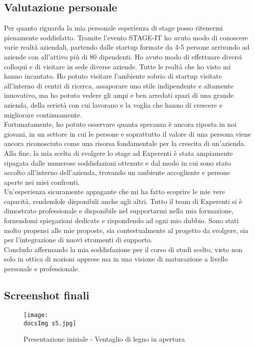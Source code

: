 \subsection{Valutazione personale}
Per quanto riguarda la mia personale esperienza di stage posso ritenermi pienamente soddisfatto. Tramite l'evento STAGE-IT ho avuto modo di conoscere varie realt\`a aziendali, partendo dalle startup formate da 4-5 persone arrivando ad aziende con all'attivo pi\`u di 80 dipendenti. Ho avuto modo di effettuare diversi colloqui e di visitare in sede diverse aziende. Tutte le realt\`a che ho visto mi hanno incantato. Ho potuto visitare l'ambiente sobrio di startup visitate all'interno di centri di ricerca, assaporare uno stile indipendente e altamente innovativo, ma ho potuto vedere gli ampi e ben arredati spazi di una grande azienda, della seriet\`a con cui lavorano e la voglia che hanno di crescere e migliorare continuamente.\\
Fortunatamente, ho potuto osservare quanta speranza \`e ancora riposta in noi giovani, in un settore in cui le persone e soprattutto il valore di una persona viene ancora riconosciuto come una risorsa fondamentale per la crescita di un'azienda.\\
Alla fine, la mia scelta di svolgere lo stage ad Experenti \`e stata ampiamente ripagata dalle numerose soddisfazioni ottenute e dal modo in cui sono stato accolto all'interno dell'azienda, trovando un ambiente accogliente e persone aperte nei miei confronti.\\
Un'esperienza sicuramente appagante che mi ha fatto scoprire le mie vere capacit\`a, rendendole disponibili anche agli altri.
Tutto il team di Experenti si \`e dimostrato professionale e disponibile nel supportarmi nella mia formazione, fornendomi spiegazioni dedicate e rispondendo ad ogni mio dubbio. Sono stati molto propensi alle mie proposte, sia contestualmente al progetto da svolgere, sia per l'integrazione di nuovi strumenti di supporto.\\
Concludo affermando la mia soddisfazione per il corso di studi scelto, visto non solo in ottica di nozioni apprese ma in una visione di maturazione a livello personale e professionale.
\newpage
\subsection{Screenshot finali}

	\begin{figure}[H]
		\centering
		\texttt{[image: \\docsImg s5.jpg]}
		\caption{Presentazione iniziale - Ventaglio di legno in apertura}
		\label{fig:Presentazione iniziale - Ventaglio di legno in apertura}
	\end{figure}
	
